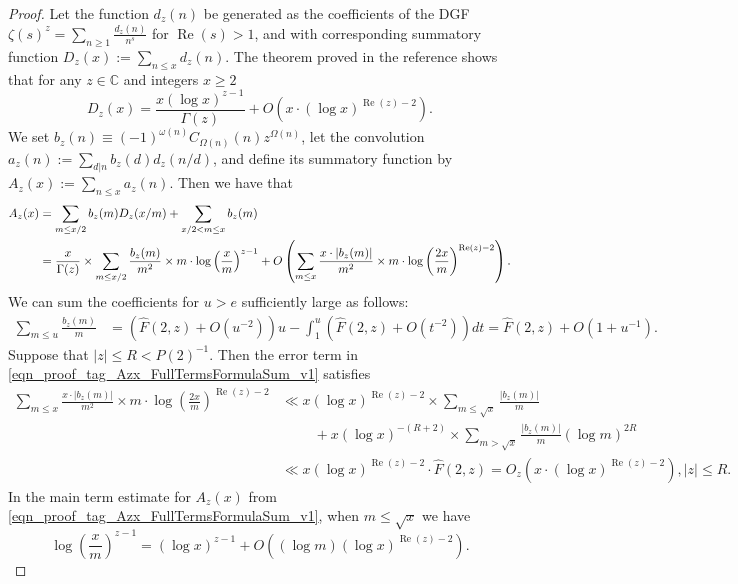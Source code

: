 \documentclass[11pt,reqno,a4letter]{article}
\numberwithin{figure}{section}
\numberwithin{table}{section}
\theoremstyle{plain}
\numberwithin{theorem}{section}
\theoremstyle{definition}
\renewcommand{\Re}{\operatorname{Re}}
\begin{document}
\begin{proof}
Let the function $d_z(n)$ be generated as the coefficients of the DGF 
$\zeta(s)^{z} = \sum_{n \geq 1} \frac{d_z(n)}{n^s}$ for $\Re(s) > 1$, and with corresponding 
summatory function $D_z(x) := \sum_{n \leq x} d_z(n)$. 
The theorem proved in the reference 
\cite[Thm.\ 7.17; \S 7.4]{MV} shows that for any $z \in \mathbb{C}$ and 
integers $x \geq 2$ 
\[
D_z(x) = \frac{x (\log x)^{z-1}}{\Gamma(z)} + O\left(x \cdot (\log x)^{\Re(z)-2}\right). 
\]
We set 
$b_z(n) \equiv (-1)^{\omega(n)} C_{\Omega(n)}(n) z^{\Omega(n)}$, let the convolution 
$a_z(n) := \sum_{d|n} b_z(d) d_z(n/d)$, and define its summatory function by 
$A_z(x) := \sum_{n \leq x} a_z(n)$. 
Then we have that 
\begin{align} 
\notag 
A_z(x) & = \sum_{m \leq x/2} b_z(m) D_z(x/m) + \sum_{x/2 < m \leq x} b_z(m) \\ 
\label{eqn_proof_tag_Azx_FullTermsFormulaSum_v1} 
     & = \frac{x}{\Gamma(z)} \times \sum_{m \leq x/2} 
     \frac{b_z(m)}{m^2} \times m \cdot \log\left(\frac{x}{m}\right)^{z-1} + 
     O\left(\sum_{m \leq x} \frac{x \cdot |b_z(m)|}{m^2} \times m \cdot 
     \log\left(\frac{2x}{m}\right)^{\Re(z) - 2}\right). 
\end{align} 
We can sum the coefficients for $u > e$ sufficiently large as follows: 
\begin{align*} 
\sum_{m \leq u} \frac{b_z(m)}{m} & = \left(\widehat{F}(2, z) + O(u^{-2})\right) u - \int_1^{u} 
     \left(\widehat{F}(2, z) + O(t^{-2})\right) dt 
     = \widehat{F}(2, z) + O(1 + u^{-1}). 
\end{align*} 
Suppose that $|z| \leq R < P(2)^{-1}$. 
Then the error term in \eqref{eqn_proof_tag_Azx_FullTermsFormulaSum_v1} satisfies 
\begin{align*} 
\sum_{m \leq x} \frac{x \cdot |b_z(m)|}{m^2} \times m \cdot 
     \log\left(\frac{2x}{m}\right)^{\Re(z) - 2} & \ll 
     x (\log x)^{\Re(z) - 2} \times \sum_{m \leq \sqrt{x}} \frac{|b_z(m)|}{m} \\ 
     & \phantom{\ll x\ } + 
     x (\log x)^{-(R+2)} \times \sum_{m > \sqrt{x}} \frac{|b_z(m)|}{m} (\log m)^{2R} \\ 
     & \ll x (\log x)^{\Re(z) - 2} \cdot \widehat{F}(2, z) 
     = O_z\left(x \cdot (\log x)^{\Re(z) - 2}\right), |z| \leq R. 
\end{align*} 
In the main term estimate for $A_z(x)$ from 
\eqref{eqn_proof_tag_Azx_FullTermsFormulaSum_v1}, when $m \leq \sqrt{x}$ we have 
\[
\log\left(\frac{x}{m}\right)^{z-1} = (\log x)^{z-1} + 
     O\left((\log m) (\log x)^{\Re(z) - 2}\right). 
\]
\end{proof}
\end{document}
